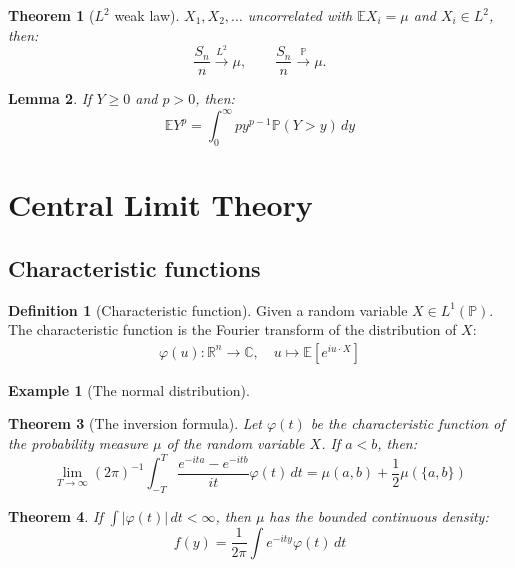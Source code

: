 \documentclass[a4paper,11pt]{book}
\newtheorem{theorem}{Theorem}[section]
\newtheorem{lemma}[theorem]{Lemma}
\theoremstyle{definition}
\newtheorem{definition}{Definition}[section]
\newtheorem*{example}{Example}
\theoremstyle{remark}
\begin{document}
\begin{theorem}[$L^2$ weak law]
	$X_1, X_2, \dots$ uncorrelated with $\mathbb{E}X_i = \mu$ and $X_i \in L^2$, then:
	\begin{equation*}
		\frac{S_n}{n} \overset{L^2}{\longrightarrow}\mu, \qquad \frac{S_n}{n} \overset{\mathbb{P}}{\longrightarrow} \mu.
	\end{equation*}
\end{theorem}

\begin{lemma}
	If $Y\geq 0$ and $p >0$, then:
	\begin{equation*}
		\mathbb{E} Y^p = \int_{0}^\infty p y^{p-1} \mathbb{P}(Y > y) \, dy
	\end{equation*}
\end{lemma}



\section{Central Limit Theory}
\subsection{Characteristic functions}
\begin{definition}[Characteristic function]
	Given a random variable $X \in L^1(\mathbb{P})$. The characteristic function is the Fourier transform of the distribution of $X$:
	\begin{align*}
		\varphi(u): \mathbb{R}^n \rightarrow \mathbb{C}, \quad u \mapsto \mathbb{E}[e^{iu \cdot X}]
	\end{align*}
\end{definition}

\begin{example}[The normal distribution]
\end{example}



\begin{theorem}[The inversion formula]
	Let $\varphi(t)$ be the characteristic function of the probability measure $\mu$ of the random variable $X$. If $a<b$, then:
	\begin{equation*}
		\lim_{T \rightarrow \infty} (2\pi)^{-1} \int_{-T}^T \frac{e^{-ita} - e^{-itb}}{it} \varphi(t) \, dt = \mu(a, b) + \frac{1}{2} \mu(\{a, b\})
	\end{equation*}
\end{theorem}

\begin{theorem}
	If $\int |\varphi(t)| \, dt < \infty$, then $\mu$ has the bounded continuous density:
	\begin{equation*}
		f(y) = \frac{1}{2\pi} \int e^{-ity} \varphi(t) \, dt
	\end{equation*}
\end{theorem}
\end{document}
